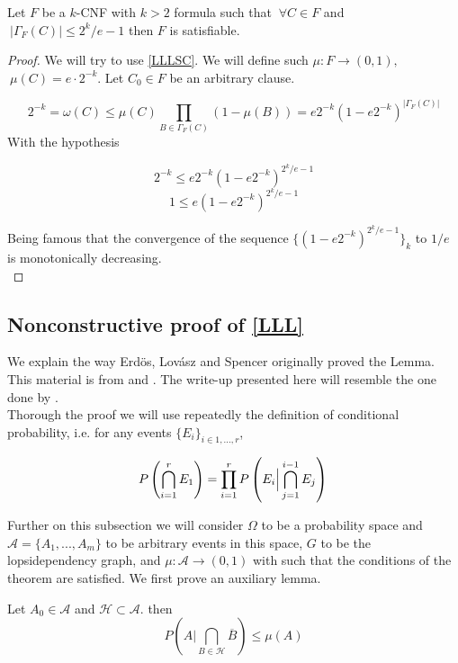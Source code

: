 \begin{corollary}
	Let $F$ be a $k$-CNF with $k>2$ formula such that $\ \forall C \in F$ and $\ |\Gamma_F(C)|\le 2^k/e-1$ then $F$ is satisfiable.
\end{corollary}
\begin{proof}
	
	 We will try to use \ref{LLLSC}. We will define such $\mu: F \to (0,1),$$\ \mu(C)=e\cdot 2^{-k}$. Let $C_0\in F$ be an arbitrary clause.
	 
	 \[
	 2^{-k}=\omega(C)\le  \mu(C) \prod_{B\in\Gamma_F(C)} (1-\mu(B)) = e2^{-k}(1-e 2^{-k})^{|\Gamma_F(C)|}
	 \]
	 With the hypothesis
	 
	\[
		 2^{-k} \le  e 2^{-k}(1-e2^{-k})^{2^k/e-1}\]\[
		 1  \le e(1-e2^{-k})^{2^k/e-1}
	\]
	
	Being famous that the convergence of the sequence $\{(1-e2^{-k})^{2^k/e-1}\}_k$ to $1/e$ is monotonically decreasing.\\
\end{proof}



\subsection{Nonconstructive proof of \ref{LLL}}

We explain the way Erdös, Lovász and Spencer originally proved the Lemma. This material is from \cite{erdos1973problems} and \cite{spencer1977asymptotic}. The write-up presented here will resemble the one done by \cite{moser2013exact}.\\



Thorough the proof we will use repeatedly the definition of conditional probability, i.e. for any events $\{E_i\}_{i\in 1,...,r}$,

\[
P\left ( \bigcap_{i=1}^r E_1\right ) = \prod_{i=1}^rP \left( E_i \Big | \bigcap_{j=1}^{i-1} E_j\right)\\
\]

Further on this subsection we will consider  $\Omega$ to be a probability space and $\mathcal{A} = \{A_1,...,A_m\}$ to be arbitrary events in this space, $G$ to be the lopsidependency graph, and $\mu: \mathcal{A} \to (0,1)$ with such that the conditions of the theorem are satisfied. We first prove an auxiliary lemma.

\begin{lemma} \label{LemaLLL}
Let $ A_0 \in \mathcal{A} $ and $\mathcal{H}\subset \mathcal{A} $. then 
\[
	P\left ( A \Big| \bigcap_{B\in \mathcal{H}} \overline{B}\right ) \le \mu(A) 
\]

		
\end{lemma}

